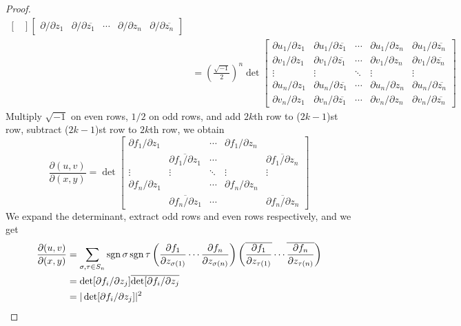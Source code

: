 \begin{proof}
\begin{align*}
\begin{bmatrix}
        \end{bmatrix}\begin{bmatrix}
            \partial/\partial{z_1} & \partial/\partial{\overline{z_1}} & \cdots & \partial/\partial{z_n} & \partial/\partial{\overline{z_n}}
        \end{bmatrix}\\
        &=\left(\frac{\sqrt{-1}}{2}\right)^n\det\begin{bmatrix}
            \partial{u_1}/\partial{z_1} & \partial{u_1}/\partial{\overline{z_1}} & \cdots & \partial{u_1}/\partial{z_n} & \partial{u_1}/\partial{\overline{z_n}}\\
            \partial{v_1}/\partial{z_1} & \partial{v_1}/\partial{\overline{z_1}} & \cdots & \partial{v_1}/\partial{z_n} & \partial{v_1}/\partial{\overline{z_n}}\\
            \vdots & \vdots & \ddots & \vdots & \vdots \\
            \partial{u_n}/\partial{z_1} & \partial{u_n}/\partial{\overline{z_1}} & \cdots & \partial{u_n}/\partial{z_n} & \partial{u_n}/\partial{\overline{z_n}}\\
            \partial{v_n}/\partial{z_1} & \partial{v_n}/\partial{\overline{z_1}} & \cdots & \partial{v_n}/\partial{z_n} & \partial{v_n}/\partial{\overline{z_n}}
        \end{bmatrix}
    \end{align*}
    Multiply $\sqrt{-1}$ on even rows, $1/2$ on odd rows, and add $2k$th row to ($2k-1$)st row, subtract ($2k-1$)st row to $2k$th row, we obtain
    \[\frac{\partial(u,v)}{\partial(x,y)}=\det\begin{bmatrix}
        \partial{f_1}/\partial{z_1} & & \cdots & \partial{f_1}/\partial{z_n} & \\
         & \overline{\partial{f_1}/\partial{z_1}} & \cdots & & \overline{\partial{f_1}/\partial{z_n}} \\
        \vdots & \vdots & \ddots & \vdots & \vdots \\
        \partial{f_n}/\partial{z_1} & & \cdots & \partial{f_n}/\partial{z_n} & \\
        & \overline{\partial{f_n}/\partial{z_1}} & \cdots & & \overline{\partial{f_n}/\partial{z_n}}
    \end{bmatrix}\]
    We expand the determinant, extract odd rows and even rows respectively, and we get
    \begin{align*}
        \frac{\partial(u,v)}{\partial(x,y)}&=\sum_{\sigma,\tau\in S_n}\operatorname{sgn}\sigma\operatorname{sgn}\tau\left(\frac{\partial{f_1}}{\partial{z_{\sigma(1)}}}\cdots\frac{\partial{f_n}}{\partial{z_{\sigma(n)}}}\right)\left(\overline{\frac{\partial{f_1}}{\partial{z_{\tau(1)}}}}\cdots\overline{\frac{\partial{f_n}}{\partial{z_{\tau(n)}}}}\right)\\
        &=\det[\partial{f_i}/\partial{z_j}]\overline{\det[\partial{f_i}/\partial{z_j}}\\
        &=|\det[\partial{f_i}/\partial{z_j}]|^2\qedhere
    \end{align*}
\end{proof}

